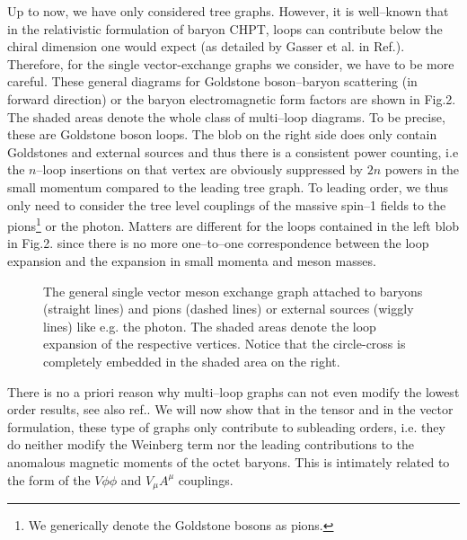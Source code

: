 Up to now, we have only considered tree graphs. However, it is
well--known that in the relativistic formulation of baryon CHPT, loops
can contribute below the chiral dimension one would expect (as
detailed by Gasser et al. in Ref.\cite{gss}). Therefore, for the
single vector-exchange graphs we consider, we have to be more careful.
These general diagrams for Goldstone boson--baryon scattering (in
forward direction) or the baryon electromagnetic form factors are
shown in Fig.2. The shaded areas denote the whole class of multi--loop
diagrams. To be precise, these are Goldstone boson loops.
The blob on the right side does only contain Goldstones and
external sources and thus there is a consistent power counting, i.e
the $n$--loop insertions on that vertex are obviously suppressed by
$2n$  powers in the small momentum compared to the leading tree graph. To
leading order, we thus only need to consider the tree level  couplings
of the massive spin--1 fields to the pions\footnote{We generically
  denote the Goldstone bosons as pions.} or the photon. Matters are
different for the loops contained in the left blob in Fig.2. since
there is no more one--to--one correspondence between the loop
expansion and the expansion in small momenta and meson masses.
\begin{figure}[t]
\hskip 2in
\epsfysize=2in
\caption{\label{fig2} The general single vector meson exchange graph
attached to baryons (straight lines) and pions (dashed lines)  or
external sources (wiggly lines) like e.g. the photon. The shaded areas
denote the loop expansion of the respective vertices. Notice that the
circle-cross is completely embedded in the shaded area on the right.}
\end{figure}
There is no a priori reason why multi--loop graphs can not even modify
the lowest order results, see also ref.\cite{gss}.
We will now show that in the tensor and in the vector
formulation, these type of graphs only contribute to subleading
orders, i.e. they do neither modify the Weinberg term nor the leading
contributions to the anomalous magnetic moments of the octet baryons.
This is intimately related to the form of the $V\phi \phi$ and $V_\mu
A^\mu$ couplings.

